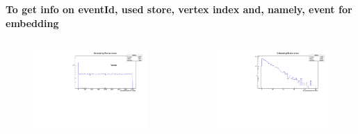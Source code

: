 \documentclass[dvipsnames] {beamer}
\begin{document}
\begin{frame}
\begin{block}{\bf \centering \tiny To get info on eventId, used store, vertex index and, namely, event for embedding}
\begin{columns}[t]
            \begin{figure}[H]
              \includegraphics[width=1.\linewidth]{EmbeddingMonitorVertex.pdf}
           \end{figure}      
           \begin{figure}[H]
              \includegraphics[width=1.\linewidth]{EmbeddingMonitorEvent.pdf}
           \end{figure}
         \end{columns}
         \end{block}
       \end{frame}
\end{document}

